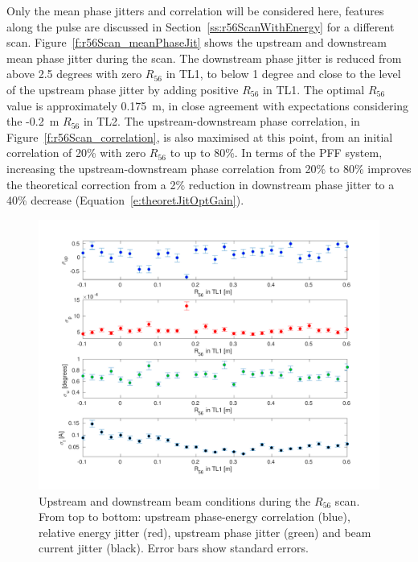 Only the mean phase jitters and correlation will be considered here, features along the pulse are discussed in Section~\ref{ss:r56ScanWithEnergy} for a different scan. Figure~\ref{f:r56Scan_meanPhaseJit} shows the upstream and downstream mean phase jitter during the scan. The downstream phase jitter is reduced from above 2.5 degrees with zero \(R_{56}\) in TL1, to below 1 degree and close to the level of the upstream phase jitter by adding positive \(R_{56}\) in TL1. The optimal \(R_{56}\) value is approximately 0.175~m, in close agreement with expectations considering the -0.2~m \(R_{56}\) in TL2. The upstream-downstream phase correlation, in Figure~\ref{f:r56Scan_correlation}, is also maximised at this point, from an initial correlation of 20\% with zero \(R_{56}\) to up to 80\%. In terms of the PFF system, increasing the upstream-downstream phase correlation from 20\% to 80\% improves the theoretical correction from a 2\% reduction in downstream phase jitter to a 40\% decrease (Equation~\ref{e:theoretJitOptGain}).


\begin{figure}
  \centering
  \includegraphics[width=\textwidth]{Figures/propagation/r56Scan_upstreamParams}
  \caption{Upstream and downstream beam conditions during the \(R_{56}\) scan. From top to bottom: upstream phase-energy correlation (blue), relative energy jitter (red), upstream phase jitter (green) and beam current jitter (black). Error bars show standard errors.}
  \label{f:r56Scan_upstreamParams}
\end{figure}

